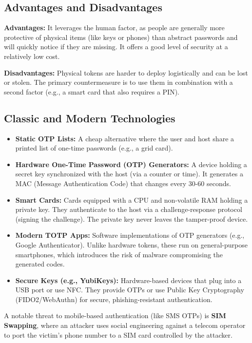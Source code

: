 \subsection{Advantages and Disadvantages}
\textbf{Advantages:} It leverages the human factor, as people are generally more protective of physical items (like keys or phones) than abstract passwords and will quickly notice if they are missing. It offers a good level of security at a relatively low cost.

\textbf{Disadvantages:} Physical tokens are harder to deploy logistically and can be lost or stolen. The primary countermeasure is to use them in combination with a second factor (e.g., a smart card that also requires a PIN).

\subsection{Classic and Modern Technologies}
\begin{itemize}
    \item \textbf{Static OTP Lists:} A cheap alternative where the user and host share a printed list of one-time passwords (e.g., a grid card).
    \item \textbf{Hardware One-Time Password (OTP) Generators:} A device holding a secret key synchronized with the host (via a counter or time). It generates a MAC (Message Authentication Code) that changes every 30-60 seconds.
    \item \textbf{Smart Cards:} Cards equipped with a CPU and non-volatile RAM holding a private key. They authenticate to the host via a challenge-response protocol (signing the challenge). The private key never leaves the tamper-proof device.
    \item \textbf{Modern TOTP Apps:} Software implementations of OTP generators (e.g., Google Authenticator). Unlike hardware tokens, these run on general-purpose smartphones, which introduces the risk of malware compromising the generated codes.
    \item \textbf{Secure Keys (e.g., YubiKeys):} Hardware-based devices that plug into a USB port or use NFC. They provide OTPs or use Public Key Cryptography (FIDO2/WebAuthn) for secure, phishing-resistant authentication.
\end{itemize}

A notable threat to mobile-based authentication (like SMS OTPs) is \textbf{SIM Swapping}, where an attacker uses social engineering against a telecom operator to port the victim's phone number to a SIM card controlled by the attacker.


